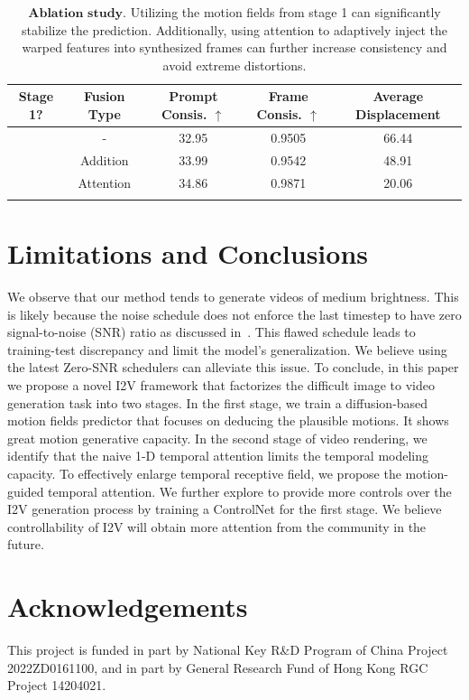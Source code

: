 \documentclass[10pt,twocolumn,letterpaper]{article}
\newcommand{\cmark}{\ding{51}}%
\newcommand{\xmark}{\text{\ding{55}}}
\begin{document}
\setlength{\tabcolsep}{1pt}
\begin{table}[h]
\centering
\scriptsize
\begin{tabular}{ccccc}
\hline
Stage 1?& Fusion Type & Prompt Consis. $\uparrow$ & Frame Consis. $\uparrow$ & Average Displacement\\

\hline
\xmark & - & 32.95 & 0.9505 & 66.44 \\
\cmark & Addition & 33.99 & 0.9542 & 48.91\\ 
\cmark & Attention & 34.86 & 0.9871 & 20.06\\
 
\hline \\
\end{tabular}
\caption{\label{Tab:ablation.} $\textbf{Ablation study.}$ Utilizing the motion fields from stage 1 can significantly stabilize the prediction. Additionally, using attention to adaptively inject the warped features into synthesized frames can further increase consistency and avoid extreme distortions.
}
\end{table}

\section{Limitations and Conclusions}

We observe that our method tends to generate videos of medium brightness. This is likely because the noise schedule does not enforce the last timestep to have zero signal-to-noise (SNR) ratio as discussed in~\cite{lin2024common}. This flawed schedule leads to training-test discrepancy and limit the model's generalization. We believe using the latest Zero-SNR schedulers can alleviate this issue. To conclude, in this paper we propose a novel I2V framework that factorizes the difficult image to video generation task into two stages. In the first stage, we train a diffusion-based motion fields predictor that focuses on deducing the plausible motions. It shows great motion generative capacity. In the second stage of video rendering, we identify that the naive 1-D temporal attention limits the temporal modeling capacity. To effectively enlarge temporal receptive field, we propose the motion-guided temporal attention. We further explore to provide more controls over the I2V generation process by training a ControlNet for the first stage. We believe controllability of I2V will obtain more attention from the community in the future.

\section{Acknowledgements}
This project is funded in part by National Key R\&D Program of China Project 2022ZD0161100, and in part by General Research Fund of Hong Kong RGC Project 14204021.

{\small


}
\end{document}
